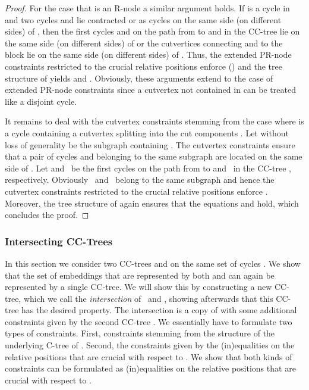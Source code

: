 \documentclass{scrartcl}
\newcommand{\1}[1]{{\normalfont \ensuremath{#1^{\tiny\circled{1}}}}} \newcommand{\2}[1]{{\normalfont \ensuremath{#1^{\tiny\circled{2}}}}} \renewcommand{\k}[1]{{\normalfont \ensuremath{#1^{\tiny\circled{k}}}}} \newcommand{\proj}[2]{\ensuremath{\left.#1\right|_{#2}}} \newcommand{\eps}{\varepsilon}
\theoremstyle{plain} \newtheorem{theorem}{Theorem} \newcounter{lemmacounter} \setcounter{lemmacounter}{0} \newtheorem{lemma}[lemmacounter]{Lemma} \newtheorem{fact}{Fact}  \newtheorem{corollary}{Corollary} \theoremstyle{definition} \newtheorem{definition}{Definition}
\begin{document}
\begin{proof}
  For the case that  is an R-node a similar argument holds.  If
   is a cycle  in  and two cycles  and
   lie contracted or as cycles on the same side (on different
  sides) of , then the first cycles  and  on the
  path from  to  and  in the CC-tree  lie on the same side (on different sides) of
   or the cutvertices connecting  and  to the
  block  lie on the same side (on different sides) of .
  Thus, the extended PR-node constraints restricted to the crucial
  relative positions enforce 
  () and the tree structure of
   yields  and
  .  Obviously, these arguments extend to
  the case of extended PR-node constraints since a cutvertex not
  contained in  can be treated like a disjoint cycle.

  It remains to deal with the cutvertex constraints stemming from the
  case where  is a cycle containing a cutvertex  splitting 
  into the cut components .  Let without loss of
  generality  be the subgraph containing .  The cutvertex
  constraints ensure that a pair of cycles  and  belonging
  to the same subgraph  are located on
  the same side of .  Let  and~ be the first cycles on
  the path from  to  and~ in the CC-tree , respectively.  Obviously~ and~ belong
  to the same subgraph  and hence the cutvertex constraints
  restricted to the crucial relative positions enforce .  Moreover, the tree structure of  again ensures that the equations  and  hold, which concludes
  the proof.
\end{proof}

\subsubsection*{Intersecting CC-Trees}
\label{sec:inters-cc-trees}

In this section we consider two CC-trees 
and  on the same set of cycles .  We show that the set of embeddings that are represented by both
 and  can
again be represented by a single CC-tree.  We will show this by
constructing a new CC-tree, which we call the \emph{intersection}
of~ and ,
showing afterwards that this CC-tree has the desired property.  The
intersection  is a copy of  with some additional constraints given by the
second CC-tree .  We essentially have to
formulate two types of constraints.  First, constraints stemming from
the structure of the underlying C-tree of .  Second, the constraints given by the (in)equalities on the
relative positions that are crucial with respect to .  We show that both kinds of constraints can be
formulated as (in)equalities on the relative positions that are
crucial with respect to .
\end{document}
